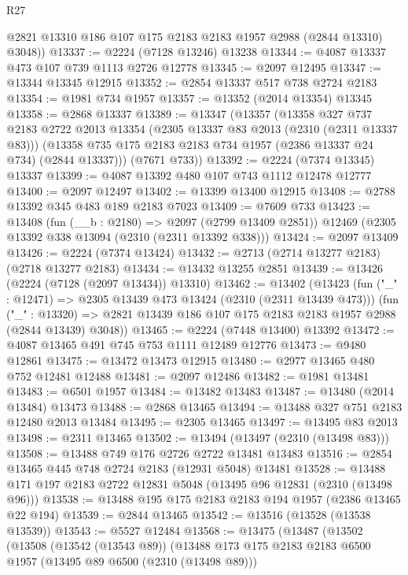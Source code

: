 \begin{lexlean}{R27}
\begin{coremodule}
      @2821 @13310 @186 @107 @175 @2183 @2183 @1957 @2988 (@2844 @13310) @3048))
@13337 := @2224 (@7128 @13246) @13238
@13344 := @4087 @13337 @473 @107 @739 @1113 @2726 @12778
@13345 := @2097 @12495
@13347 := @13344 @13345 @12915
@13352 := @2854 @13337 @517 @738 @2724 @2183
@13354 := @1981 @734 @1957
@13357 := @13352 (@2014 @13354) @13345
@13358 := @2868 @13337
@13389 := @13347
    (@13357
      (@13358
        @327
        @737
        @2183
        @2722
        @2013
        @13354
        (@2305 @13337 @83 @2013 (@2310 (@2311 @13337 @83)))
        (@13358 @735 @175 @2183 @2183 @734 @1957 (@2386 @13337 @24 @734) (@2844 @13337)))
      (@7671 @733))
@13392 := @2224 (@7374 @13345) @13337
@13399 := @4087 @13392 @480 @107 @743 @1112 @12478 @12777
@13400 := @2097 @12497
@13402 := @13399 @13400 @12915
@13408 := @2788 @13392 @345 @483 @189 @2183 @7023
@13409 := @7609 @733
@13423 := @13408
    (fun (__b : @2180) => @2097 (@2799 @13409 @2851))
    @12469
    (@2305 @13392 @338 @13094 (@2310 (@2311 @13392 @338)))
@13424 := @2097 @13409
@13426 := @2224 (@7374 @13424)
@13432 := @2713 (@2714 @13277 @2183) (@2718 @13277 @2183)
@13434 := @13432 @13255 @2851
@13439 := @13426 (@2224 (@7128 (@2097 @13434)) @13310)
@13462 := @13402
    (@13423
      (fun ("_" : @12471) => @2305 @13439 @473 @13424 (@2310 (@2311 @13439 @473)))
      (fun ("_" : @13320) =>
      @2821 @13439 @186 @107 @175 @2183 @2183 @1957 @2988 (@2844 @13439) @3048))
@13465 := @2224 (@7448 @13400) @13392
@13472 := @4087 @13465 @491 @745 @753 @1111 @12489 @12776
@13473 := @9480 @12861
@13475 := @13472 @13473 @12915
@13480 := @2977 @13465 @480 @752 @12481 @12488
@13481 := @2097 @12486
@13482 := @1981 @13481
@13483 := @6501 @1957
@13484 := @13482 @13483
@13487 := @13480 (@2014 @13484) @13473
@13488 := @2868 @13465
@13494 := @13488 @327 @751 @2183 @12480 @2013 @13484
@13495 := @2305 @13465
@13497 := @13495 @83 @2013
@13498 := @2311 @13465
@13502 := @13494 (@13497 (@2310 (@13498 @83)))
@13508 := @13488 @749 @176 @2726 @2722 @13481 @13483
@13516 := @2854 @13465 @445 @748 @2724 @2183 (@12931 @5048) @13481
@13528 := @13488 @171 @197 @2183 @2722 @12831 @5048 (@13495 @96 @12831 (@2310 (@13498 @96)))
@13538 := @13488 @195 @175 @2183 @2183 @194 @1957 (@2386 @13465 @22 @194)
@13539 := @2844 @13465
@13542 := @13516 (@13528 (@13538 @13539))
@13543 := @5527 @12484
@13568 := @13475
    (@13487
      (@13502
        (@13508
          (@13542 (@13543 @89))
          (@13488
            @173
            @175
            @2183
            @2183
            @6500
            @1957
            (@13495 @89 @6500 (@2310 (@13498 @89)))

\end{coremodule}
\end{lexlean}
